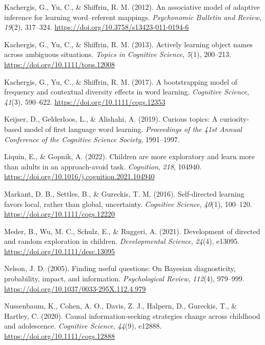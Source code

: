 \documentclass[10pt, letterpaper]{article}
\begin{document}
\begin{CSLReferences}{1}{0}
Kachergis, G., Yu, C., \& Shiffrin, R. M. (2012). An associative model
of adaptive inference for learning word--referent mappings.
\emph{Psychonomic Bulletin and Review}, \emph{19}(2), 317--324.
\url{https://doi.org/10.3758/s13423-011-0194-6}

Kachergis, G., Yu, C., \& Shiffrin, R. M. (2013). Actively learning
object names across ambiguous situations. \emph{Topics in Cognitive
Science}, \emph{5}(1), 200--213.
\url{https://doi.org/10.1111/tops.12008}

Kachergis, G., Yu, C., \& Shiffrin, R. M. (2017). A bootstrapping model
of frequency and contextual diversity effects in word learning.
\emph{Cognitive Science}, \emph{41}(3), 590--622.
\url{https://doi.org/10.1111/cogs.12353}

Keijser, D., Gelderloos, L., \& Alishahi, A. (2019). Curious topics: {A}
curiosity-based model of first language word learning. \emph{Proceedings
of the 41st {Annual} {Conference} of the {Cognitive} {Science}
{Society}}, 1991--1997.

Liquin, E., \& Gopnik, A. (2022). Children are more exploratory and
learn more than adults in an approach-avoid task. \emph{Cognition},
\emph{218}, 104940.
\url{https://doi.org/10.1016/j.cognition.2021.104940}

Markant, D. B., Settles, B., \& Gureckis, T. M. (2016). Self-directed
learning favors local, rather than global, uncertainty. \emph{Cognitive
Science}, \emph{40}(1), 100--120.
\url{https://doi.org/10.1111/cogs.12220}

Meder, B., Wu, M. C., Schulz, E., \& Ruggeri, A. (2021). Development of
directed and random exploration in children. \emph{Developmental
Science}, \emph{24}(4), e13095. \url{https://doi.org/10.1111/desc.13095}

Nelson, J. D. (2005). Finding useful questions: {On} {Bayesian}
diagnosticity, probability, impact, and information. \emph{Psychological
Review}, \emph{112}(4), 979--999.
\url{https://doi.org/10.1037/0033-295X.112.4.979}

Nussenbaum, K., Cohen, A. O., Davis, Z. J., Halpern, D., Gureckis, T.,
\& Hartley, C. (2020). Causal information-seeking strategies change
across childhood and adolescence. \emph{Cognitive Science},
\emph{44}(9), e12888. \url{https://doi.org/10.1111/cogs.12888}


\end{CSLReferences}
\end{document}
